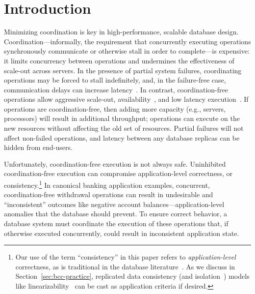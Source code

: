 
\section{Introduction}
\label{sec:intro}


Minimizing coordination is key in high-performance, scalable database
design. Coordination---informally, the requirement that concurrently
executing operations synchronously communicate or otherwise stall in
order to complete---is expensive: it limits concurrency between
operations and undermines the effectiveness of scale-out across
servers. In the presence of partial system failures, coordinating
operations may be forced to stall indefinitely, and, in the
failure-free case, communication delays can increase
latency~\cite{hat-vldb,gilbert-cap}. In contrast, coordination-free
operations allow aggressive scale-out,
availability~\cite{gilbert-cap}, and low latency
execution~\cite{pacelc}. If operations are coordination-free, then
adding more capacity (e.g., servers, processors) will result in additional
throughput; operations can execute on the new resources without
affecting the old set of resources. Partial failures will not affect
non-failed operations, and latency between any database replicas can
be hidden from end-users.


Unfortunately, coordination-free execution is not always safe. Uninhibited
coordination-free execution can compromise application-level
correctness, or consistency.\footnote{Our use of the term
  ``consistency'' in this paper refers to \textit{application-level} correctness, as
  is traditional in the database
  literature~\cite{gray-virtues,bernstein-book,eswaran-consistency,traiger-tods,davidson-survey}. As
  we discuss in Section~\ref{sec:bcc-practice}, replicated data
  consistency (and isolation~\cite{adya-isolation,hat-vldb})
  models like linearizability~\cite{gilbert-cap} can be cast as
  application criteria if desired.} In canonical banking application
examples, concurrent, coordination-free withdrawal operations can
result in undesirable and ``inconsistent'' outcomes like negative account
balances---application-level anomalies that the database should
prevent. To ensure correct behavior, a database system must coordinate
the execution of these operations that, if otherwise executed
concurrently, could result in inconsistent application state.

